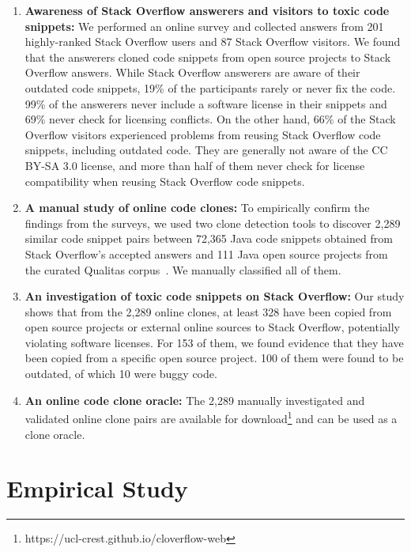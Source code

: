 \documentclass[10pt,journal,compsoc]{IEEEtran}
\begin{document}
\begin{enumerate} 
	
	\item \textbf{Awareness of Stack Overflow answerers and visitors to toxic code
	snippets:} We performed an online survey and collected answers from 201
highly-ranked Stack Overflow users and 87 Stack Overflow visitors. 
We found that the answerers cloned code snippets
from open source projects to Stack Overflow answers. While Stack Overflow
answerers are aware of their outdated code snippets, 19\% of the participants
rarely or never fix the code. 99\% of the answerers never include a software
license in their snippets and 69\% never check for licensing conflicts.
On the other hand, 66\% of the
Stack Overflow visitors experienced problems from reusing Stack Overflow code snippets, including outdated code. 
They are generally not aware of the CC BY-SA 3.0 license, and more than
half of them never check for license compatibility when reusing Stack Overflow
code snippets.
	
	\item \textbf{A manual study of online code clones:} 
	To empirically confirm the findings from the surveys, we used
	two clone detection tools to discover 2,289 similar code snippet pairs between
	72,365 Java code snippets obtained from Stack Overflow's accepted answers and
	111 Java open source projects from the curated Qualitas
	corpus~\cite{QualitasCorpus}. We manually
	classified all of them.
	
	\item \textbf{An investigation of toxic code snippets on Stack Overflow:} Our study shows that from
	the 2,289 online clones, at least 328 have been copied from open source
	projects or external online sources to Stack Overflow, potentially violating
	software licenses. For 153 of them, we found evidence that they have been copied
	from a specific open source project. 
	100 of them were found to be outdated, of which 10 were buggy code.
	
	\item \textbf{An online code
		clone oracle:} The 2,289 manually investigated and validated online clone pairs
	are available for download\footnote{https://ucl-crest.github.io/cloverflow-web} and
	can be used as a clone oracle. \end{enumerate}

\section{Empirical Study}
\end{document}
